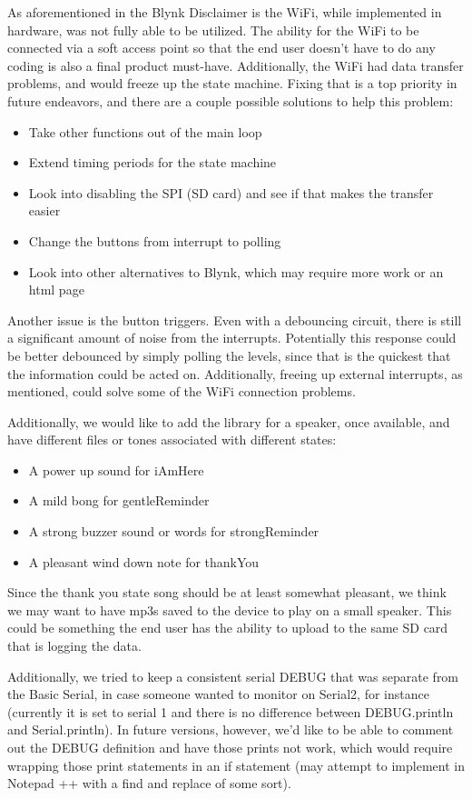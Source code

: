 \documentclass{article}
\begin{document}
As aforementioned in the Blynk Disclaimer is the WiFi, while implemented in hardware, was not fully able to be utilized. The ability for the WiFi to be connected via a soft access point so that the end user doesn't have to do any coding is also a final product must-have. Additionally, the WiFi had data transfer problems, and would freeze up the state machine. Fixing that is a top priority in future endeavors, and there are a couple possible solutions to help this problem:
\begin{itemize}
	\item Take other functions out of the main loop
	\item Extend timing periods for the state machine
	\item Look into disabling the SPI (SD card) and see if that makes the transfer easier
	\item Change the buttons from interrupt to polling
	\item Look into other alternatives to Blynk, which may require more work or an html page
\end{itemize}

Another issue is the button triggers. Even with a debouncing circuit, there is still a significant amount of noise from the interrupts. Potentially this response could be better debounced by simply polling the levels, since that is the quickest that the information could be acted on. Additionally, freeing up external interrupts, as mentioned, could solve some of the WiFi connection problems. 

Additionally, we would like to add the library for a speaker, once available, and have different files or tones associated with different states:
\begin{itemize}
	\item A power up sound for iAmHere
	\item A mild bong for gentleReminder
	\item A strong buzzer sound or words for strongReminder
	\item A pleasant wind down note for thankYou
\end{itemize}

Since the thank you state song should be at least somewhat pleasant, we think we may want to have mp3s saved to the device to play on a small speaker. This could be something the end user has the ability to upload to the same SD card that is logging the data. 

Additionally, we tried to keep a consistent serial DEBUG that was separate from the Basic Serial, in case someone wanted to monitor on Serial2, for instance (currently it is set to serial 1 and there is no difference between DEBUG.println and Serial.println). In future versions, however, we'd like to be able to comment out the DEBUG definition and have those prints not work, which would require wrapping those print statements in an if statement (may attempt to implement in Notepad ++ with a find and replace of some sort).
\end{document}
